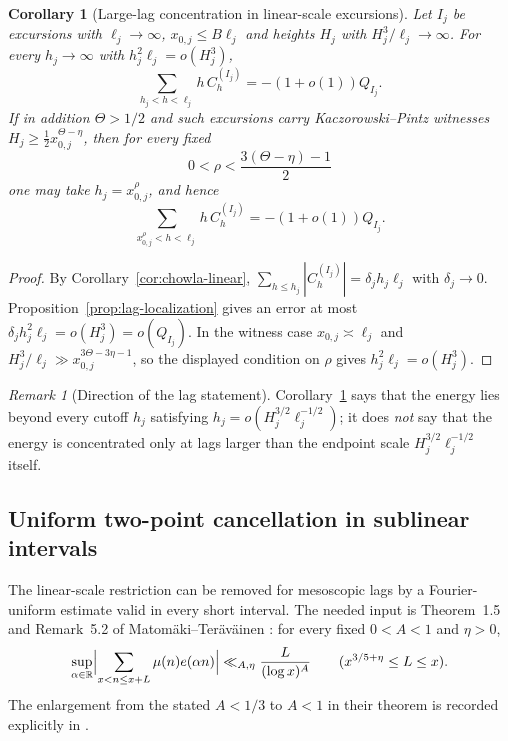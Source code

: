 \documentclass[11pt]{amsart}
\numberwithin{equation}{section}
\theoremstyle{plain}
\newtheorem{corollary}[theorem]{Corollary}
\theoremstyle{definition}
\theoremstyle{remark}
\newtheorem{remark}[theorem]{Remark}
\begin{document}
\begin{corollary}[Large-lag concentration in linear-scale excursions]
\label{cor:large-lag}
Let $I_j$ be excursions with $\ell_j\to\infty$, $x_{0,j}\le B\ell_j$ and
heights $H_j$ with $H_j^3/\ell_j\to\infty$. For every $h_j\to\infty$ with
$h_j^2\ell_j=o(H_j^3)$,
\[
\sum_{h_j<h<\ell_j}h\,C^{(I_j)}_h=-(1+o(1))Q_{I_j}.
\]
If in addition $\Theta>1/2$ and such excursions carry
Kaczorowski--Pintz witnesses
$H_j\ge\frac12x_{0,j}^{\Theta-\eta}$, then for every fixed
\[
0<\rho<\frac{3(\Theta-\eta)-1}{2}
\]
one may take $h_j=x_{0,j}^{\rho}$, and hence
\[
\sum_{x_{0,j}^{\rho}<h<\ell_j}h\,C_h^{(I_j)}=-(1+o(1))Q_{I_j}.
\]
\end{corollary}

\begin{proof}
By Corollary~\ref{cor:chowla-linear},
$\sum_{h\le h_j}|C^{(I_j)}_h|=\delta_jh_j\ell_j$ with $\delta_j\to0$.
Proposition~\ref{prop:lag-localization} gives an error at most
$\delta_jh_j^2\ell_j=o(H_j^3)=o(Q_{I_j})$. In the witness case
$x_{0,j}\asymp\ell_j$ and
$H_j^3/\ell_j\gg x_{0,j}^{3\Theta-3\eta-1}$, so the displayed condition on
$\rho$ gives $h_j^2\ell_j=o(H_j^3)$.
\end{proof}

\begin{remark}[Direction of the lag statement]
\label{rem:large-lag-direction}
Corollary~\ref{cor:large-lag} says that the energy lies beyond every cutoff
$h_j$ satisfying $h_j=o(H_j^{3/2}\ell_j^{-1/2})$; it does \emph{not} say
that the energy is concentrated only at lags larger than the endpoint scale
$H_j^{3/2}\ell_j^{-1/2}$ itself.
\end{remark}

\subsection{Uniform two-point cancellation in sublinear intervals}
\label{subsec:sublinear-chowla}

The linear-scale restriction can be removed for mesoscopic lags by a
Fourier-uniform estimate valid in every short interval. The needed input is
Theorem~1.5 and Remark~5.2 of Matom\"aki--Ter\"av\"ainen
\cite{MatomakiTeravainen2023}: for every fixed $0<A<1$ and $\eta>0$,
\begin{equation}
\label{eq:MT-fourier}
\sup_{\alpha\in\mathbb R}\Bigl|\sum_{x<n\le x+L}\mu(n)e(\alpha n)\Bigr|
\ll_{A,\eta}\frac{L}{(\log x)^A}
\qquad(x^{3/5+\eta}\le L\le x).
\end{equation}
The enlargement from the stated $A<1/3$ to $A<1$ in their theorem is
recorded explicitly in \cite{MSTT23}.
\end{document}
